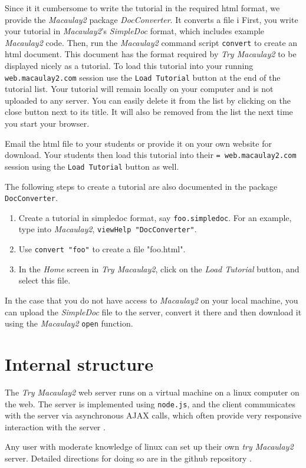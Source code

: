 \documentclass[]{article}
\def\tryM2{{\it Try Macaulay2}}
\def\M2{{\it Macaulay2}}
\begin{document}
Since it it cumbersome to write the tutorial in the required html format, we provide the \M2 package {\it DocConverter}. It converts a file i  
First, you write your tutorial in \M2's {\it SimpleDoc} format, which includes example \M2 code.
Then, run the \M2 command script {\tt convert} to create an html document. This document has the format required by \tryM2 to be displayed nicely as a tutorial. To load this tutorial into your running {\tt web.macaulay2.com} session use the {\tt Load Tutorial} button at the end of the tutorial list.
Your tutorial will remain locally on your computer and is not uploaded to any server. You can easily delete it from the list by clicking on the close button next to its title. It will also be removed from the list the next time you start your browser. 

Email the html file to your students or provide it on your own website for download. Your students then load this tutorial into their {\tt= web.macaulay2.com} session using the {\tt Load Tutorial} button as well.

The following steps to create a tutorial are also documented in the package {\tt DocConverter}.
\begin{enumerate}
\item Create a tutorial in simpledoc format, say {\tt foo.simpledoc}.  For an example, type into \M2, {\tt viewHelp "DocConverter"}.
\item Use {\tt convert "foo"} to create a file "foo.html".
\item In the {\it Home} screen in \tryM2, click on the {\it Load Tutorial} button, and select this file.
\end{enumerate}

In the case that you do not have access to \M2 on your local machine, you can upload the {\it SimpleDoc} file to the server, convert it there and then download it using the \M2 {\tt open} function.


\section{Internal structure}

The \tryM2 web server runs on a virtual machine on a linux computer on the web.
The server is implemented using {\tt node.js}, and the client
communicates with the server via asynchronous AJAX calls, which often
provide very responsive interaction with the server \cite{nodejs}.

Any user with moderate knowledge of linux can set up their own {\it try Macaulay2}
server.  Detailed directions for doing so are in the github repository \cite{github}.
\end{document}
